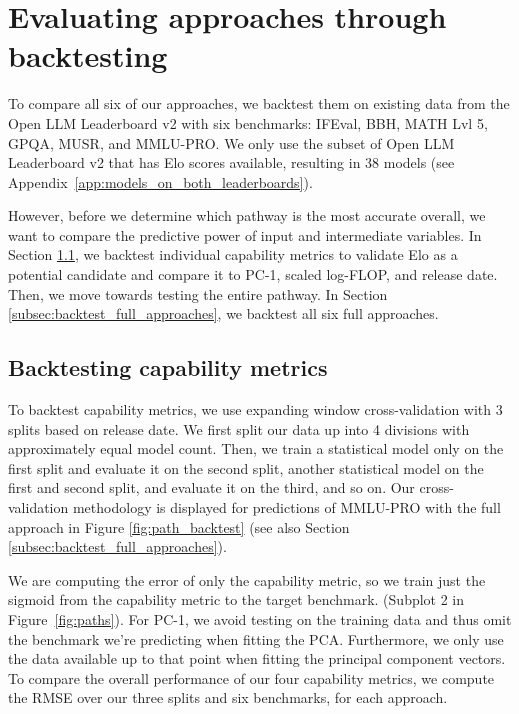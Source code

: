 \section{Evaluating approaches through backtesting}

To compare all six of our approaches, we backtest them on existing data from the Open LLM Leaderboard v2 \citep{open-llm-leaderboard-v2} with six benchmarks: IFEval, BBH, MATH Lvl 5, GPQA, MUSR, and MMLU-PRO.
We only use the subset of Open LLM Leaderboard v2 that has Elo scores available, resulting in 38 models (see Appendix~\ref{app:models_on_both_leaderboards}).

However, before we determine which pathway is the most accurate overall, we want to compare the predictive power of input and intermediate variables.
In Section \ref{subsec:backtest_capability_metrics}, we backtest individual capability metrics to validate Elo as a potential candidate and compare it to PC-1, scaled log-FLOP, and release date.
Then, we move towards testing the entire pathway. In Section \ref{subsec:backtest_full_approaches}, we backtest all six full approaches.

\subsection{Backtesting capability metrics}
\label{subsec:backtest_capability_metrics}

To backtest capability metrics, we use expanding window cross-validation \cite{expanding_window_backtest} with 3 splits based on release date.
We first split our data up into 4 divisions with approximately equal model count.
Then, we train a statistical model only on the first split and evaluate it on the second split, another statistical model on the first and second split, and evaluate it on the third, and so on.
Our cross-validation methodology is displayed for predictions of MMLU-PRO with the full approach in Figure \ref{fig:path_backtest} (see also Section \ref{subsec:backtest_full_approaches}).

We are computing the error of only the capability metric, so we train just the sigmoid from the capability metric to the target benchmark. (Subplot 2 in Figure~\ref{fig:paths}).
For PC-1, we avoid testing on the training data and thus omit the benchmark we're predicting when fitting the PCA. Furthermore, we only use the data available up to that point when fitting the principal component vectors.  
To compare the overall performance of our four capability metrics, we compute the RMSE over our three splits and six benchmarks, for each approach.

